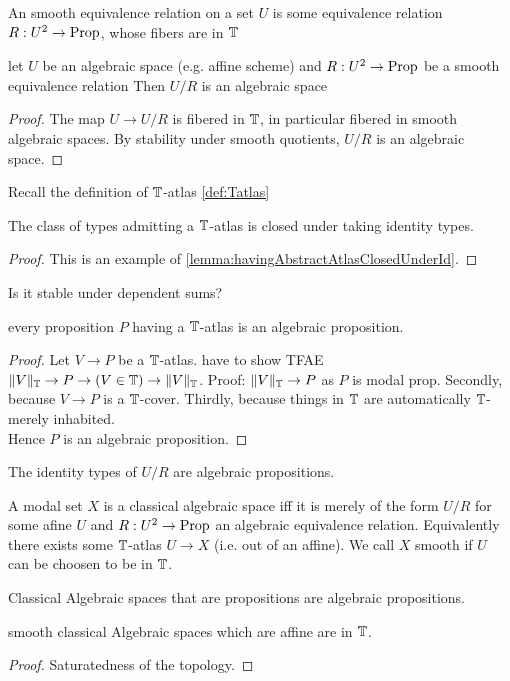 \begin{definition}
	An smooth equivalence relation on a set $U$ is some equivalence relation $R : U^2 \to \operatorname{Prop}$, whose fibers are in $\mathbb{T}$
\end{definition}
\begin{lemma}
	let $U$ be an algebraic space (e.g. affine scheme) and $R : U^2 \to \operatorname{Prop}$ be a smooth equivalence relation %
	Then $U / R$ is an algebraic space
\end{lemma}
\begin{proof}
	The map $U \to U / R$ is fibered in $\mathbb{T}$, in particular fibered in smooth algebraic spaces.%
	By stability under smooth quotients, $U / R$ is an algebraic space.
\end{proof}
Recall the definition of $\mathbb{T}$-atlas \ref{def:Tatlas}
\begin{lemma}{\label{lemma:havingAtlasClosedUnderId}}
	The class of types admitting a $\mathbb{T}$-atlas is closed under taking identity types. 
\end{lemma}
\begin{proof}
	This is an example of \ref{lemma:havingAbstractAtlasClosedUnderId}.
\end{proof}
\begin{question}
	Is it stable under dependent sums?
\end{question}

\begin{prop}
	every proposition $P$ having a $\mathbb{T}$-atlas is an algebraic proposition.
	
\end{prop}
\begin{proof}
	Let $V \to P$ be a $\mathbb{T}$-atlas.
	have to show TFAE $\|V\|_{\mathbb{T}} \to P \to (V \in \mathbb{T}) \to \|V\|_{\mathbb{T}}$. 
	Proof: $\|V\|_{\mathbb{T}} \to P$ as $P$ is modal prop. Secondly, because $V \to P$ is a $\mathbb{T}$-cover. Thirdly, because things in $\mathbb{T}$ are automatically $\mathbb{T}$-merely inhabited. \\
	Hence $P$ is an algebraic proposition.	
\end{proof}
\begin{corollary}
	The identity types of $U / R$ are algebraic propositions. %
\end{corollary}
\begin{definition}
	A modal set $X$ is a classical algebraic space iff it is merely of the form $U / R$ for some afine $U$ and  $R : U^2 \to \operatorname{Prop}$ an algebraic equivalence relation. Equivalently there exists some $\mathbb{T}$-atlas $U \to X$ (i.e. out of an affine). We call $X$ smooth if $U$ can be choosen to be in $\mathbb{T}$.
\end{definition}
\begin{corollary}
	Classical Algebraic spaces that are propositions are algebraic propositions.
\end{corollary}

\begin{lemma}
	smooth classical Algebraic spaces which are affine are in $\mathbb{T}$.
\end{lemma}
\begin{proof}
	Saturatedness of the topology.
\end{proof}

